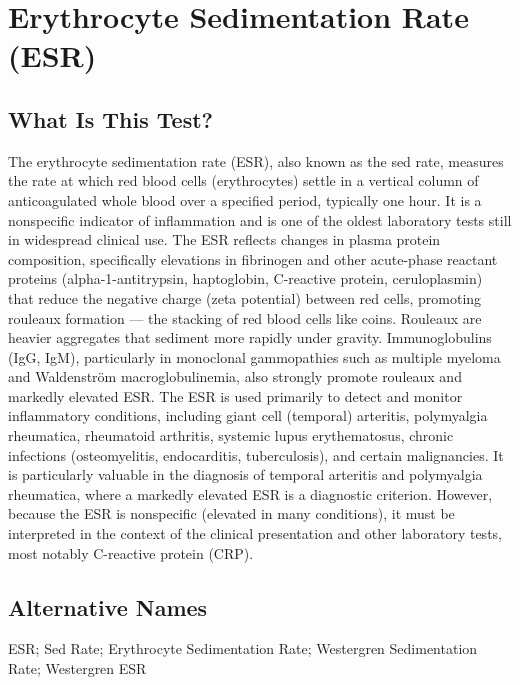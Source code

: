 \chapter{Erythrocyte Sedimentation Rate (ESR)}

\section*{What Is This Test?}
The erythrocyte sedimentation rate (ESR), also known as the sed rate, measures the rate at which red blood cells (erythrocytes) settle in a vertical column of anticoagulated whole blood over a specified period, typically one hour. It is a nonspecific indicator of inflammation and is one of the oldest laboratory tests still in widespread clinical use. The ESR reflects changes in plasma protein composition, specifically elevations in fibrinogen and other acute-phase reactant proteins (alpha-1-antitrypsin, haptoglobin, C-reactive protein, ceruloplasmin) that reduce the negative charge (zeta potential) between red cells, promoting rouleaux formation --- the stacking of red blood cells like coins. Rouleaux are heavier aggregates that sediment more rapidly under gravity. Immunoglobulins (IgG, IgM), particularly in monoclonal gammopathies such as multiple myeloma and Waldenstr\"{o}m macroglobulinemia, also strongly promote rouleaux and markedly elevated ESR. The ESR is used primarily to detect and monitor inflammatory conditions, including giant cell (temporal) arteritis, polymyalgia rheumatica, rheumatoid arthritis, systemic lupus erythematosus, chronic infections (osteomyelitis, endocarditis, tuberculosis), and certain malignancies. It is particularly valuable in the diagnosis of temporal arteritis and polymyalgia rheumatica, where a markedly elevated ESR is a diagnostic criterion. However, because the ESR is nonspecific (elevated in many conditions), it must be interpreted in the context of the clinical presentation and other laboratory tests, most notably C-reactive protein (CRP).

\section*{Alternative Names}
ESR; Sed Rate; Erythrocyte Sedimentation Rate; Westergren Sedimentation Rate; Westergren ESR

